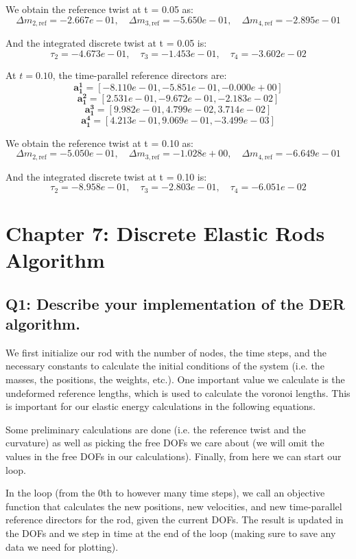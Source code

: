 \documentclass[letterpaper, 10 pt, conference]{ieeeconf}  %
\begin{document}
We obtain the reference twist at t = 0.05 as:
\[ 
\Delta m_{2, \text{ref}} = -2.667e-01, \quad \Delta m_{3, \text{ref}} = -5.650e-01, \quad \Delta m_{4, \text{ref}} = -2.895e-01 
\]

And the integrated discrete twist at t = 0.05 is:
\[ 
\tau_2 = -4.673e-01, \quad \tau_3 = -1.453e-01, \quad \tau_4 = -3.602e-02 
\]

At \( t = 0.10 \), the time-parallel reference directors are:
\[ 
\mathbf{a_1^1} = [-8.110e-01, -5.851e-01, -0.000e+00] \]
\[ 
\mathbf{a_1^2} = [ 2.531e-01, -9.672e-01, -2.183e-02] \]
\[ 
\mathbf{a_1^3} = [ 9.982e-01,  4.799e-02,  3.714e-02] \]
\[ 
\mathbf{a_1^4} = [ 4.213e-01,  9.069e-01, -3.499e-03] \]

We obtain the reference twist at t = 0.10 as:
\[ 
\Delta m_{2, \text{ref}} = -5.050e-01, \quad \Delta m_{3, \text{ref}} = -1.028e+00, \quad \Delta m_{4, \text{ref}} = -6.649e-01 
\]

And the integrated discrete twist at t = 0.10 is:
\[ 
\tau_2 = -8.958e-01, \quad \tau_3 = -2.803e-01, \quad \tau_4 = -6.051e-02 
\]

\bigskip

\section{Chapter 7: Discrete Elastic Rods Algorithm} 

\subsection*{Q1: Describe your implementation of the DER algorithm.}

We first initialize our rod with the number of nodes, the time steps, and the necessary constants to calculate the initial conditions of the system (i.e. the masses, the positions, the weights, etc.). One important value we calculate is the undeformed reference lengths, which is used to calculate the voronoi lengths. This is important for our elastic energy calculations in the following equations.

Some preliminary calculations are done (i.e. the reference twist and the curvature) as well as picking the free DOFs we care about (we will omit the values in the free DOFs in our calculations). Finally, from here we can start our loop.

In the loop (from the 0th to however many time steps), we call an objective function that calculates the new positions, new velocities, and new time-parallel reference directors for the rod, given the current DOFs. The result is updated in the DOFs and we step in time at the end of the loop (making sure to save any data we need for plotting).
\end{document}
